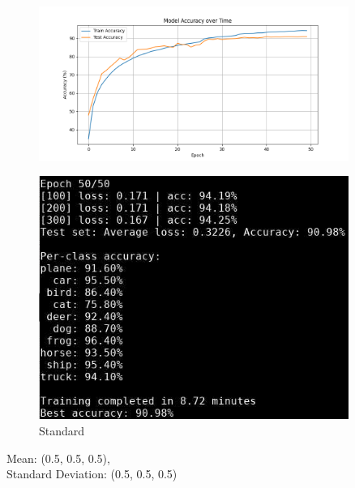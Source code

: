 \documentclass{beamer}
\begin{document}
\begin{frame}
\begin{columns}
    \begin{column}{0.4\textwidth}
        \begin{figure}[t]
            \centering
            \vspace{-0.4cm}
            \includegraphics[width=0.9\textwidth]{media/cifar10_cnn_std_accuracy.png}
        \end{figure}
        \vspace{-0.6cm}
        \begin{figure}[t]
            \centering
            \includegraphics[width=0.9\textwidth]{media/cnn_std_epoch_50.png}
            \vspace{-0.3cm}
            \caption{Standard}
        \end{figure}
        Mean: (0.5, 0.5, 0.5),\\
        Standard Deviation: (0.5, 0.5, 0.5)
    \end{column}


\end{columns}
\end{frame}
\end{document}
